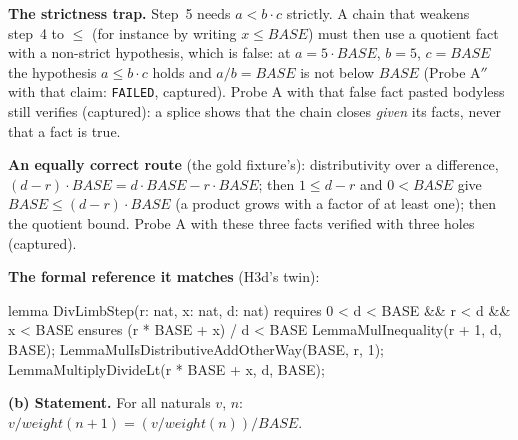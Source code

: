 \documentclass[11pt]{article}
\begin{document}
\textbf{The strictness trap.} Step~5 needs $a < b \cdot c$ strictly. A chain
that weakens step~4 to $\leq$ (for instance by writing $x \leq \mathit{BASE}$)
must then use a quotient fact with a non-strict hypothesis, which is false:
at $a = 5 \cdot \mathit{BASE}$, $b = 5$, $c = \mathit{BASE}$ the hypothesis
$a \leq b \cdot c$ holds and $a / b = \mathit{BASE}$ is not below
$\mathit{BASE}$ (Probe A$''$ with that claim: \texttt{FAILED}, captured).
Probe A with that false fact pasted bodyless still verifies (captured): a
splice shows that the chain closes \emph{given} its facts, never that a fact
is true.

\textbf{An equally correct route} (the gold fixture's): distributivity over a
difference, $(d - r) \cdot \mathit{BASE} = d \cdot \mathit{BASE} - r \cdot
\mathit{BASE}$; then $1 \leq d - r$ and $0 < \mathit{BASE}$ give
$\mathit{BASE} \leq (d - r) \cdot \mathit{BASE}$ (a product grows with a
factor of at least one); then the quotient bound. Probe A with these three
facts verified with three holes (captured).

\textbf{The formal reference it matches} (H3d's twin):
\begin{dafnycode}
lemma DivLimbStep(r: nat, x: nat, d: nat)
  requires 0 < d < BASE && r < d && x < BASE
  ensures (r * BASE + x) / d < BASE
{
  LemmaMulInequality(r + 1, d, BASE);
  LemmaMulIsDistributiveAddOtherWay(BASE, r, 1);
  LemmaMultiplyDivideLt(r * BASE + x, d, BASE);
}
\end{dafnycode}

\textbf{(b) Statement.} For all naturals $v$, $n$:
$v / \mathit{weight}(n + 1) = (v / \mathit{weight}(n)) / \mathit{BASE}$.
\end{document}
